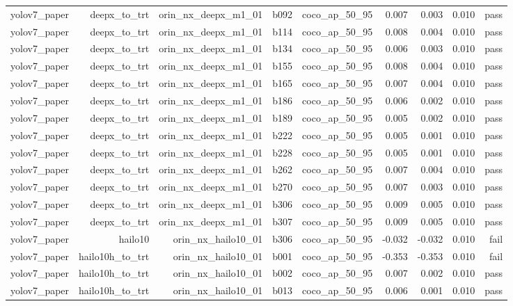 \begin{table}[t]
\begin{tabular}{lrrrrrrrr}
yolov7\_paper & deepx\_to\_trt & orin\_nx\_deepx\_m1\_01 & b092 & coco\_ap\_50\_95 & 0.007 & 0.003 & 0.010 & pass \\
yolov7\_paper & deepx\_to\_trt & orin\_nx\_deepx\_m1\_01 & b114 & coco\_ap\_50\_95 & 0.008 & 0.004 & 0.010 & pass \\
yolov7\_paper & deepx\_to\_trt & orin\_nx\_deepx\_m1\_01 & b134 & coco\_ap\_50\_95 & 0.006 & 0.003 & 0.010 & pass \\
yolov7\_paper & deepx\_to\_trt & orin\_nx\_deepx\_m1\_01 & b155 & coco\_ap\_50\_95 & 0.008 & 0.004 & 0.010 & pass \\
yolov7\_paper & deepx\_to\_trt & orin\_nx\_deepx\_m1\_01 & b165 & coco\_ap\_50\_95 & 0.007 & 0.004 & 0.010 & pass \\
yolov7\_paper & deepx\_to\_trt & orin\_nx\_deepx\_m1\_01 & b186 & coco\_ap\_50\_95 & 0.006 & 0.002 & 0.010 & pass \\
yolov7\_paper & deepx\_to\_trt & orin\_nx\_deepx\_m1\_01 & b189 & coco\_ap\_50\_95 & 0.005 & 0.002 & 0.010 & pass \\
yolov7\_paper & deepx\_to\_trt & orin\_nx\_deepx\_m1\_01 & b222 & coco\_ap\_50\_95 & 0.005 & 0.001 & 0.010 & pass \\
yolov7\_paper & deepx\_to\_trt & orin\_nx\_deepx\_m1\_01 & b228 & coco\_ap\_50\_95 & 0.005 & 0.001 & 0.010 & pass \\
yolov7\_paper & deepx\_to\_trt & orin\_nx\_deepx\_m1\_01 & b262 & coco\_ap\_50\_95 & 0.007 & 0.004 & 0.010 & pass \\
yolov7\_paper & deepx\_to\_trt & orin\_nx\_deepx\_m1\_01 & b270 & coco\_ap\_50\_95 & 0.007 & 0.003 & 0.010 & pass \\
yolov7\_paper & deepx\_to\_trt & orin\_nx\_deepx\_m1\_01 & b306 & coco\_ap\_50\_95 & 0.009 & 0.005 & 0.010 & pass \\
yolov7\_paper & deepx\_to\_trt & orin\_nx\_deepx\_m1\_01 & b307 & coco\_ap\_50\_95 & 0.009 & 0.005 & 0.010 & pass \\
yolov7\_paper & hailo10 & orin\_nx\_hailo10\_01 & b306 & coco\_ap\_50\_95 & -0.032 & -0.032 & 0.010 & fail \\
yolov7\_paper & hailo10h\_to\_trt & orin\_nx\_hailo10\_01 & b001 & coco\_ap\_50\_95 & -0.353 & -0.353 & 0.010 & fail \\
yolov7\_paper & hailo10h\_to\_trt & orin\_nx\_hailo10\_01 & b002 & coco\_ap\_50\_95 & 0.007 & 0.002 & 0.010 & pass \\
yolov7\_paper & hailo10h\_to\_trt & orin\_nx\_hailo10\_01 & b013 & coco\_ap\_50\_95 & 0.006 & 0.001 & 0.010 & pass \\

\end{tabular}
\end{table}
